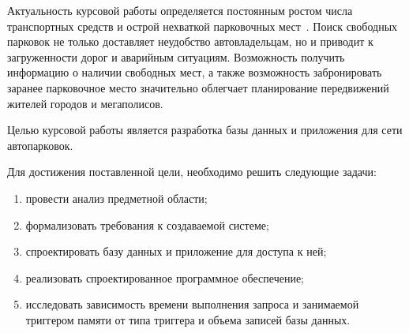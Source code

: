 
Актуальность курсовой работы определяется постоянным ростом числа транспортных средств и острой нехваткой парковочных мест~\cite{actual_parking}.
Поиск свободных парковок не только доставляет неудобство автовладельцам, но и приводит к загруженности дорог и аварийным ситуациям.
Возможность получить информацию о наличии свободных мест, а также возможность забронировать заранее парковочное место значительно облегчает планирование передвижений жителей городов и мегаполисов.

Целью курсовой работы является разработка базы данных и приложения для сети автопарковок.

Для достижения поставленной цели, необходимо решить следующие задачи:
\begin{enumerate}
	\item провести анализ предметной области;
	\item формализовать требования к создаваемой системе;
	\item спроектировать базу данных и приложение для доступа к ней;
	\item реализовать спроектированное программное обеспечение;
	\item исследовать зависимость времени выполнения запроса и занимаемой триггером памяти от типа триггера и объема записей базы данных.
\end{enumerate}

